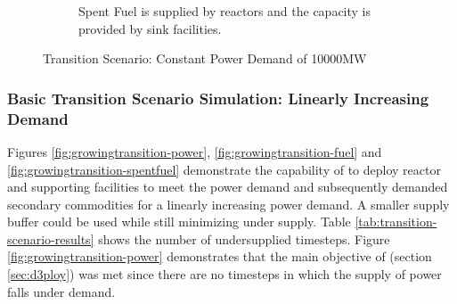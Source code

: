 \begin{figure}[]
\begin{subfigure}[t]{0.6\textwidth}
            \caption{Spent Fuel is supplied by reactors and the capacity is provided by sink facilities.}
            \label{fig:constanttransition-spentfuel}
        \end{subfigure}
        \caption{Transition Scenario: Constant Power Demand of 10000MW}
    \end{figure}

    \subsubsection{\textbf{Basic Transition Scenario Simulation: Linearly Increasing Demand}}

    Figures \ref{fig:growingtransition-power}, \ref{fig:growingtransition-fuel}
    and \ref{fig:growingtransition-spentfuel} demonstrate the capability 
    of \deploy to deploy reactor and supporting facilities to meet the
    power demand and subsequently demanded secondary commodities 
    for a linearly increasing power demand. 
    A smaller supply buffer could be used while still minimizing under supply.
    Table \ref{tab:transition-scenario-results} shows the number of 
    undersupplied timesteps. 
    Figure \ref{fig:growingtransition-power} demonstrates that
    the main objective of \deploy (section \ref{sec:d3ploy}) 
    was met since there are no timesteps
    in which the supply of power falls under demand.
    
